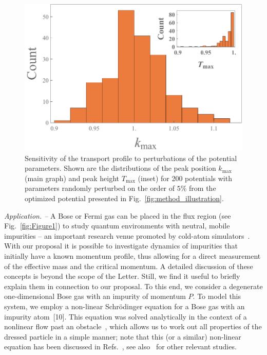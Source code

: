 \documentclass[twocolumn,amsmath,amssymb,showpacs,prl,superscriptaddress,aps]{revtex4-1}
\begin{document}
\begin{figure}
   \includegraphics[width=1\linewidth]{figures/plot_sensitivity.pdf}
 \caption[Sensitivity Plot]{Sensitivity of the transport profile to perturbations of the potential parameters. Shown are the distributions of the peak position $k_{\mathrm{max}}$ (main graph) and peak height $T_{\mathrm{max}}$ (inset) for 200 potentials with parameters randomly perturbed on the order of $5\%$ from the optimized potential presented in Fig.~\ref{fig:method_illustration}.}
 \label{fig:sensitivity}
\end{figure}



{\it Application. --} A Bose or Fermi gas can be placed in the flux region  (see Fig.~\ref{fig:Figure1}) to study quantum environments with neutral, mobile impurities -- an important research venue promoted by cold-atom simulators~\cite{zwierlein2009,salomon2009,grimm2012, widera2012, catani2012, fukuhara2013, hu2016,arlt2016,zaccanti2017}. With our proposal it is possible to investigate dynamics of impurities that initially have a known momentum profile, thus allowing for a direct measurement of the effective mass and the critical momentum. A detailed discussion of these concepts is beyond the scope of the Letter. Still, we find it useful to briefly explain them in connection to our proposal. To this end, we consider a degenerate one-dimensional Bose gas with an impurity of momentum $P$. To model this system, we employ a non-linear Schr{\"o}dinger equation for a Bose gas with an impurity atom~[10]. This equation was solved analytically in the context of a nonlinear flow past an obstacle~\cite{hakim1997}, which allows us to work out all properties of the dressed particle in a simple manner; note that this (or a similar) non-linear equation has been discussed in Refs.~\cite{kamenev2016, volosniev2017, mistakidis2018, dehkharghani2018, pastukhov2018}, see also~\cite{sacha2006, catani2012, kain2016, parisi2017,grusdt2017, pastukhov2017, kain2018} for other relevant studies. 
\end{document}
